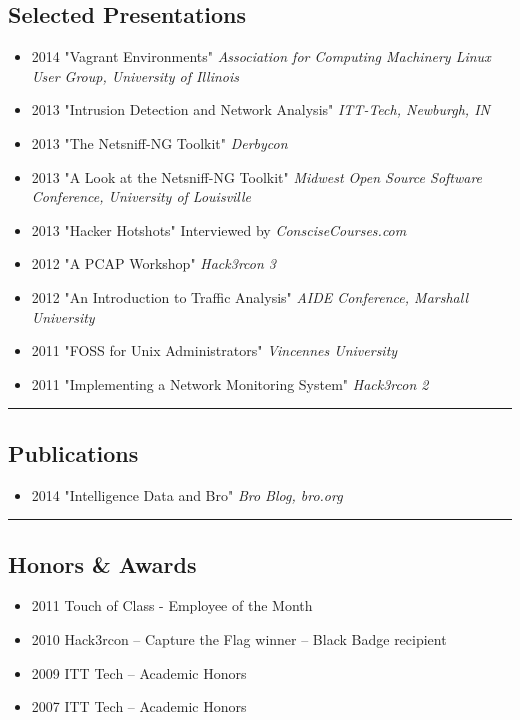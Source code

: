 \documentclass[10pt,letterpaper]{article}
\begin{document}
\subsection*{Selected Presentations}

\begin{itemize}
	\parskip=0.1em
	\item \textsc{2014} "Vagrant Environments" \textit{Association for Computing Machinery Linux User Group,     University of Illinois}
	\item \textsc{2013} "Intrusion Detection and Network Analysis" \textit{ITT-Tech, Newburgh, IN}
	\item \textsc{2013} "The Netsniff-NG Toolkit" \textit{Derbycon}
	\item \textsc{2013} "A Look at the Netsniff-NG Toolkit" \textit{Midwest Open Source Software Conference, University of Louisville}
	\item \textsc{2013} "Hacker Hotshots" Interviewed by \textit{ConsciseCourses.com}
	\item \textsc{2012} "A PCAP Workshop" \textit{Hack3rcon 3}
	\item \textsc{2012} "An Introduction to Traffic Analysis" \textit{AIDE Conference, Marshall University}
	\item \textsc{2011} "FOSS for Unix Administrators" \textit{Vincennes University}
	\item \textsc{2011} "Implementing a Network Monitoring System" \textit{Hack3rcon 2}

\end{itemize}

\hrule
\vspace{-0.4em}
\subsection*{Publications}
\begin{itemize}
	\parskip=0.1em
	\item \textsc{2014} "Intelligence Data and Bro" \textit{Bro Blog, bro.org}
\end{itemize}

\hrule
\vspace{-0.4em}
\subsection*{Honors \& Awards}

\begin{itemize}
	\parskip=0.1em

	\item \textsc{2011} Touch of Class - Employee of the Month
	\item \textsc{2010} Hack3rcon – Capture the Flag winner – Black Badge recipient
	\item \textsc{2009} ITT Tech – Academic Honors
	\item \textsc{2007} ITT Tech – Academic Honors

\end{itemize}
\end{document}
